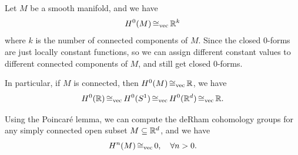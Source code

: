 \begin{example}[Special case for \(n = 0\)]
    Let \(M\) be a smooth manifold, and we have
    \begin{equation*}
        H^0(M) \operatorname{\mathrel{\cong_{\text{vec}}}} \mathbb R^k
    \end{equation*}
    where \(k\) is the number of connected components of \(M\). Since the closed 0-forms are just locally constant functions, so we can assign different constant values to different connected components of \(M\), and still get closed 0-forms.

    In particular, if \(M\) is connected, then \(H^0(M) \operatorname{\mathrel{\cong_{\text{vec}}}} \mathbb R\), we have
    \begin{equation*}
        H^0(\mathbb R) \operatorname{\mathrel{\cong_{\text{vec}}}} H^0(S^1) \operatorname{\mathrel{\cong_{\text{vec}}}} H^0(\mathbb R^d) \operatorname{\mathrel{\cong_{\text{vec}}}} \mathbb R.
    \end{equation*}
\end{example}
Using the Poincar\'e lemma, we can compute the deRham cohomology groups for any simply connected open subset \(M \subseteq \mathbb R^d\), and we have
\begin{equation*}
    H^n(M) \operatorname{\mathrel{\cong_{\text{vec}}}} 0, \quad \forall n > 0.
\end{equation*}
